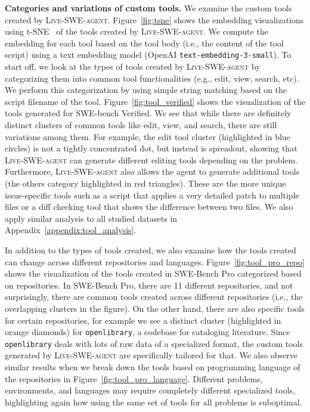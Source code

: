 \documentclass{article}
\newcommand{\tech}{\textsc{Live-SWE-agent}\xspace}
\newcommand{\swebench}{SWE-bench\xspace}
\newcommand{\swebenchpro}{SWE-Bench Pro\xspace}
\newcommand{\parabf}[1]{\vspace{.03in}\noindent \textbf{#1}}
\newcommand{\CodeIn}[1]{{\small \texttt{#1}}}
\begin{document}
\parabf{Categories and variations of custom tools.}
We examine the custom tools created by \tech{}. 
Figure~\ref{fig:tsne} shows the embedding visualizations using t-SNE~\citep{hinton2002stochastic} of the tools created by \tech{}. 
We compute the embedding for each tool based on the tool body (i.e., the content of the tool script) using a text embedding model (OpenAI \CodeIn{text-embedding-3-small}).
To start off, we look at the types of tools created by \tech by categorizing them into common tool functionalities (e.g., edit, view, search, etc). 
We perform this categorization by using simple string matching based on the script filename of the tool.
Figure~\ref{fig:tool_verified} shows the visualization of the tools generated for \swebench Verified. 
We see that while there are definitely distinct clusters of common tools like edit, view, and search, there are still variations among them.
For example, the edit tool cluster (highlighted in blue circles) is not a tightly concentrated dot, but instead is spreadout, showing that \tech can generate different editing tools depending on the problem.
Furthermore, \tech also allows the agent to generate additional tools (the others category highlighted in red triangles). 
These are the more unique issue-specific tools such as a script that applies a very detailed patch to multiple files or a diff checking tool that shows the difference between two files.
We also apply similar analysis to all studied datasets in Appendix~\ref{appendix:tool_analysis}.


In addition to the types of tools created, we also examine how the tools created can change across different repositories and languages.
Figure~\ref{fig:tool_pro_repo} shows the visualization of the tools created in \swebenchpro categorized based on repositories.
In \swebenchpro, there are 11 different repositories, and not surprisingly, there are common tools created across different repositories (i.e., the overlapping clusters in the figure). 
On the other hand, there are also specific tools for certain repositories, for example we see a distinct cluster (highlighted in orange diamonds) for \CodeIn{openlibrary}, a codebase for cataloging literature.
Since \CodeIn{openlibrary} deals with lots of raw data of a specialized format, the custom tools generated by \tech are specifically tailored for that.
We also observe similar results when we break down the tools based on programming language of the repositories in Figure~\ref{fig:tool_pro_language}.
Different problems, environments, and languages may require completely different specialized tools, highlighting again how using the same set of tools for all problems is suboptimal.
\end{document}
